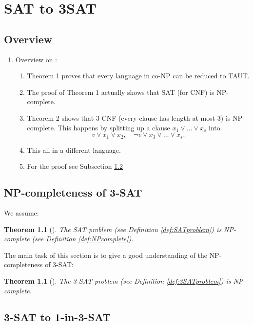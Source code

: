\documentclass[a4paper]{report}
\newtheorem{thm}[defi]{Theorem}
\begin{document}
\chapter{SAT to 3SAT}
\label{cha:sat13}


\section{Overview}
\label{sec:sat13Overview}

\begin{enumerate}
\item Overview on \cite{Cook1971NP}:
  \begin{enumerate}
  \item Theorem 1 proves that every language in co-NP can be reduced to TAUT.
  \item The proof of Theorem 1 actually shows that SAT (for CNF) is NP-complete.
  \item Theorem 2 shows that 3-CNF (every clause has length at most 3) is NP-complete. This happens by splitting up a clause $x_1 \vee \dots \vee x_s$ into
    \begin{displaymath}
      v \vee x_1 \vee x_2, \quad \neg v \vee x_3 \vee \dots \vee x_s.
    \end{displaymath}
  \item This all in a different language.
  \item For the proof see Subsection \ref{sec:3SATNPcomp}
  \end{enumerate}
\end{enumerate}



\section{NP-completeness of 3-SAT}
\label{sec:3SATNPcomp}

We assume:
\begin{thm}[{{\cite[Theorem 1]{Cook1971NP}}}]\label{thm:SATNPcomplete}
  The SAT problem (see Definition \ref{def:SATproblem}) is NP-complete (see Definition \ref{def:NPcomplete}).
\end{thm}

The main task of this section is to give a good understanding of the NP-completeness of 3-SAT:
\begin{thm}[{{\cite[Theorem 2]{Cook1971NP}}}]\label{thm:SATNPcomplete}
  The 3-SAT problem (see Definition \ref{def:3SATproblem}) is NP-complete.
\end{thm}





\section{3-SAT to 1-in-3-SAT}
\label{sec:3satto13}





\end{document}
